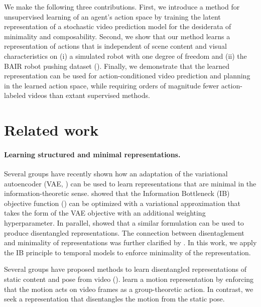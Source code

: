\documentclass{article} %
\begin{document}
We make the following three contributions.  First, we introduce 
a method for unsupervised learning of an agent's action space by training the %
latent representation of a stochastic video prediction model for the desiderata of minimality and composability. Second, we show that our method learns a representation of actions that is independent of scene content and visual characteristics on (i) a simulated robot with one degree of freedom and (ii) the BAIR robot pushing dataset (\cite{ebert2017self}).  Finally, we demonstrate that the learned representation can be used for action-conditioned video prediction and planning in the learned action space, while requiring orders of magnitude fewer action-labeled videos than extant supervised methods.

\section{Related work}

\paragraph{Learning structured and minimal representations.}

Several groups have recently shown how an adaptation of the variational autoencoder (VAE, \cite{kingma2014auto,
rezende2014stochastic}) can be used to learn representations that are minimal in the information-theoretic sense. \cite{alemi2016deep} showed that the
Information Bottleneck (IB) objective function (\cite{tishby1999information, shwartz2017opening}) 
can be optimized with a variational approximation that takes the form of the VAE objective with an additional weighting hyperparameter. %
In parallel, \cite{higgins2017beta} showed that a similar formulation can be used to produce disentangled representations. The connection between disentaglement and minimality of representations was further clarified by \cite{burgess2018understanding}. In this work, we apply the IB principle
to temporal models to enforce minimality of the representation.  %

Several groups have proposed methods to learn disentangled representations of static content and pose from video (\cite{denton2017unsupervised,tulyakov2017mocogan}).  \cite{jaegle2016unsupervised} learn a motion representation by enforcing that the motion acts on video frames as a group-theoretic action. In contrast, we seek a representation that disentangles the motion from the static pose. %
 
\end{document}
